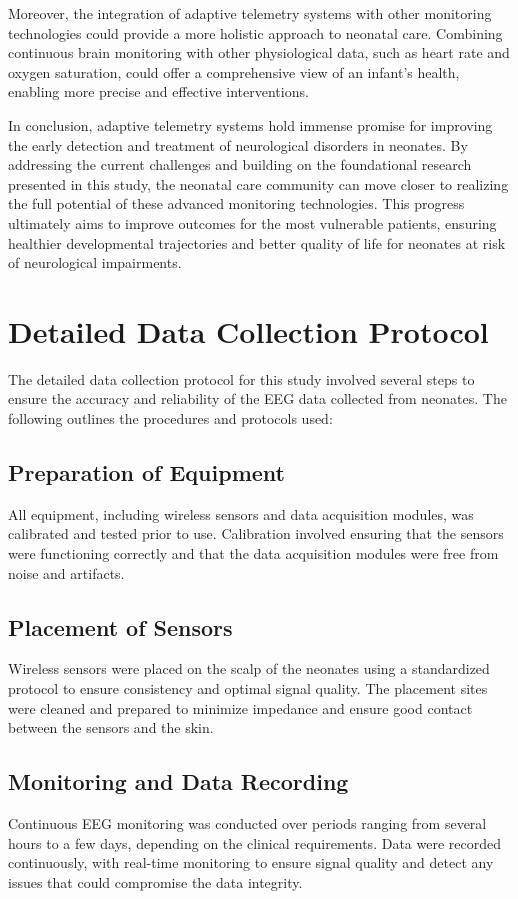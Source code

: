 \documentclass[12pt,journal,compsoc]{IEEEtran}
\begin{document}
Moreover, the integration of adaptive telemetry systems with other monitoring technologies could provide a more holistic approach to neonatal care. Combining continuous brain monitoring with other physiological data, such as heart rate and oxygen saturation, could offer a comprehensive view of an infant's health, enabling more precise and effective interventions.

In conclusion, adaptive telemetry systems hold immense promise for improving the early detection and treatment of neurological disorders in neonates. By addressing the current challenges and building on the foundational research presented in this study, the neonatal care community can move closer to realizing the full potential of these advanced monitoring technologies. This progress ultimately aims to improve outcomes for the most vulnerable patients, ensuring healthier developmental trajectories and better quality of life for neonates at risk of neurological impairments.

\appendices
\section{Detailed Data Collection Protocol}
The detailed data collection protocol for this study involved several steps to ensure the accuracy and reliability of the EEG data collected from neonates. The following outlines the procedures and protocols used:

\subsection{Preparation of Equipment}
All equipment, including wireless sensors and data acquisition modules, was calibrated and tested prior to use. Calibration involved ensuring that the sensors were functioning correctly and that the data acquisition modules were free from noise and artifacts.

\subsection{Placement of Sensors}
Wireless sensors were placed on the scalp of the neonates using a standardized protocol to ensure consistency and optimal signal quality. The placement sites were cleaned and prepared to minimize impedance and ensure good contact between the sensors and the skin.

\subsection{Monitoring and Data Recording}
Continuous EEG monitoring was conducted over periods ranging from several hours to a few days, depending on the clinical requirements. Data were recorded continuously, with real-time monitoring to ensure signal quality and detect any issues that could compromise the data integrity.
\end{document}
